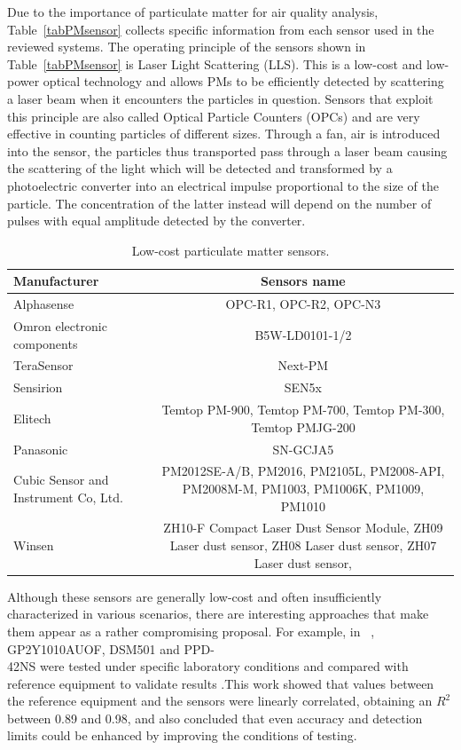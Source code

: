 \documentclass[10pt]{../style_src/imeko_acta}
\begin{document}
Due to the importance of particulate matter for air quality analysis, Table~\ref{tabPMsensor} collects specific information from each sensor used in the reviewed systems. 
The operating principle of the sensors shown in Table~\ref{tabPMsensor} is Laser Light Scattering (LLS). This is a low-cost and low-power optical technology and allows PMs to be efficiently detected by scattering a laser beam when it encounters the particles in question. Sensors that exploit this principle are also called Optical Particle Counters (OPCs) and are very effective in counting particles of different sizes. Through a fan, air is introduced into the sensor, the particles thus transported pass through a laser beam causing the scattering of the light which will be detected and transformed by a photoelectric converter into an electrical impulse proportional to the size of the particle. The concentration of the latter instead will depend on the number of pulses with equal amplitude detected by the converter.

\begin{table}[]
	\caption{Low-cost particulate matter sensors.}
	\label{tabLCPMs}
	\centering
	\begin{tabularx}{\columnwidth}{lC}
		\toprule
		Manufacturer\therownum	& Sensors name\\
		\midrule	
		Alphasense      &   OPC-R1, OPC-R2, OPC-N3\\
		Omron electronic components &  B5W-LD0101-1/2      \\
		TeraSensor & Next-PM \\
		Sensirion & SEN5x \\
		Elitech & Temtop PM-900, Temtop PM-700, Temtop PM-300, Temtop PMJG-200 \\
		Panasonic & SN-GCJA5 \\
		Cubic Sensor and Instrument Co, Ltd.    &  PM2012SE-A/B, PM2016, PM2105L, PM2008-API, PM2008M-M, PM1003, PM1006K, PM1009, PM1010 \\
		Winsen &  ZH10-F Compact Laser Dust Sensor Module, ZH09 Laser dust sensor, ZH08 Laser dust sensor, ZH07 Laser dust sensor, \\
		\bottomrule
	\end{tabularx}
\end{table}

Although these sensors are generally low-cost and often insufficiently characterized in various scenarios, there are interesting approaches that make them appear as a rather compromising proposal. For example, in ~\cite{wang2015laboratory}, GP2Y1010AUOF, DSM501 and  PPD-\\42NS were tested under specific laboratory conditions and compared with reference equipment to validate results .This work showed that values between the reference equipment and the sensors were linearly correlated, obtaining an $R^2$ between 0.89 and 0.98, and also concluded that even accuracy and detection limits could be enhanced by improving the conditions of testing. 
\end{document}
